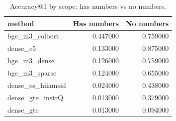 \begin{table}
\caption{Accuracy@1 by scope: has numbers vs no numbers.}
\label{tab:acc1}
\begin{tabular}{lrr}
\toprule
method & Has numbers & No numbers \\
\midrule
bge_m3_colbert & 0.447000 & 0.759000 \\
dense_e5 & 0.133000 & 0.875000 \\
bge_m3_dense & 0.126000 & 0.759000 \\
bge_m3_sparse & 0.124000 & 0.655000 \\
dense_es_hiiamsid & 0.024000 & 0.438000 \\
dense_gte_instrQ & 0.013000 & 0.379000 \\
dense_gte & 0.013000 & 0.094000 \\
\bottomrule
\end{tabular}
\end{table}
